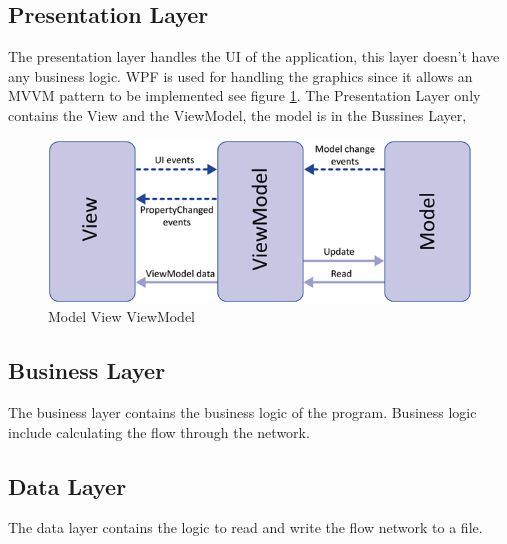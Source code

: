 \subsection{Presentation Layer}
The presentation layer handles the UI of the application, this layer doesn't have any business logic. WPF is used for handling the graphics since it allows an MVVM pattern to be implemented see figure \ref{fig:mvvm}. The Presentation Layer only contains the View and the ViewModel, the model is in the Bussines Layer,
\begin{figure}[h!]
  \centering
    \includegraphics[scale=0.8]{figures/mvvm.png}
  \caption{Model View ViewModel}
  \label{fig:mvvm}
\end{figure}

\subsection{Business Layer}
The business layer contains the business logic of the program. Business logic include calculating the flow through the network.

\subsection{Data Layer}
The data layer contains the logic to read and write the flow network to a file.